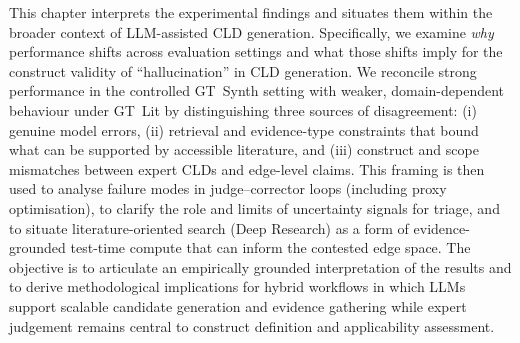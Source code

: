 %
%

\noindent
This chapter interprets the experimental findings and situates them within the broader context of LLM-assisted CLD generation. Specifically, we examine \emph{why} performance shifts across evaluation settings and what those shifts imply for the construct validity of ``hallucination'' in CLD generation. We reconcile strong performance in the controlled GT~Synth setting with weaker, domain-dependent behaviour under GT~Lit by distinguishing three sources of disagreement: (i) genuine model errors, (ii) retrieval and evidence-type constraints that bound what can be supported by accessible literature, and (iii) construct and scope mismatches between expert CLDs and edge-level claims. This framing is then used to analyse failure modes in judge--corrector loops (including proxy optimisation), to clarify the role and limits of uncertainty signals for triage, and to situate literature-oriented search (Deep Research) as a form of evidence-grounded test-time compute that can inform the contested edge space. The objective is to articulate an empirically grounded interpretation of the results and to derive methodological implications for hybrid workflows in which LLMs support scalable candidate generation and evidence gathering while expert judgement remains central to construct definition and applicability assessment.

